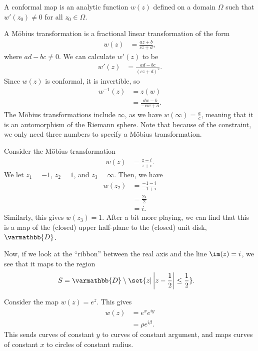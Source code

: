 \documentclass[10pt]{mypackage}
\renewcommand*{\mathbb}[1]{\varmathbb{#1}}
\begin{document}
\begin{definition}
  A conformal map is an analytic function $w(z) $ defined on a domain $\Omega$ such that $w'\left(z_0\right) \neq 0$ for all $z_0\in \Omega$.
\end{definition}
\begin{example}
  A Möbius transformation is a fractional linear transformation of the form
  \begin{align*}
    w(z) &= \frac{az + b}{cz + d},
  \end{align*}
  where $ad - bc \neq 0$. We can calculate $w'(z)$ to be
  \begin{align*}
    w'(z) &= \frac{ad-bc}{\left( cz + d \right)^2}.
  \end{align*}
  Since $w(z)$ is conformal, it is invertible, so
  \begin{align*}
    w^{-1}(z) &= z(w)\\
              &= \frac{dw-b}{-cw + a}.
  \end{align*}
  The Möbius transformations include $\infty$, as we have $w(\infty) = \frac{a}{c}$, meaning that it is an automorphism of the Riemann sphere. Note that because of the constraint, we only need three numbers to specify a Möbius transformation.\newline

  Consider the Möbius transformation
  \begin{align*}
    w(z) &= \frac{z-i}{z+i}.
  \end{align*}
  We let $z_1 = -1$, $z_2 = 1$, and $z_3 = \infty$. Then, we have
  \begin{align*}
    w\left(z_2\right) &= \frac{-1-i}{-1+i}\\
         &= \frac{2i}{2}\\
         &= i.
  \end{align*}
  Similarly, this gives $w\left( z_3 \right) = 1$. After a bit more playing, we can find that this is a map of the (closed) upper half-plane to the (closed) unit disk, $\mathbb{D}$.\newline

  Now, if we look at the ``ribbon'' between the real axis and the line $\im(z) = i$, we see that it maps to the region
  \begin{align*}
    S &= \mathbb{D}\setminus \set{z | \left\vert z-\frac{1}{2} \right\vert \leq \frac{1}{2}}.
  \end{align*}
\end{example}
\begin{example}
  Consider the map $w(z) = e^{z}$. This gives
  \begin{align*}
    w(z) &= e^{x}e^{iy}\\
         &= \rho e^{i\beta}.
  \end{align*}
  This sends curves of constant $y$ to curves of constant argument, and maps curves of constant $x$ to circles of constant radius.
\end{example}
\end{document}
